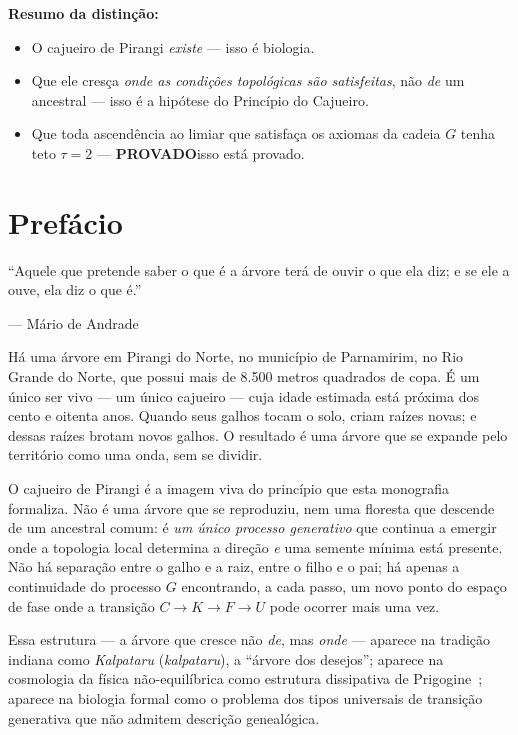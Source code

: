 \documentclass[12pt,a4paper,twoside]{book}
\theoremstyle{plain}
\theoremstyle{definition}
\newcommand{\provadostamp}{\noindent\colorbox{cajunavy!10}{\color{cajunavy}\bfseries\small PROVADO}\quad}
\theoremstyle{definition}
\begin{document}
\begin{tcolorbox}[
  colback=cajunavy!5,
  colframe=cajunavy!40,
  title={Para o leitor biólogo, médico ou engenheiro químico},
  breakable
]
\medskip
\textbf{Resumo da distinção:}
\begin{itemize}
  \item O cajueiro de Pirangi \emph{existe} --- isso é biologia.
  \item Que ele cresça \emph{onde as condições topológicas são satisfeitas},
        não \emph{de} um ancestral --- isso é a hipótese do Princípio do Cajueiro.
  \item Que toda ascendência ao limiar que satisfaça os axiomas da cadeia $G$
        tenha teto $\tau = 2$ --- \provadostamp isso está provado.
\end{itemize}

\end{tcolorbox}

\bigskip
\tableofcontents

\chapter*{Prefácio}

\epigraph{``Aquele que pretende saber o que é a árvore terá de ouvir o que ela
diz; e se ele a ouve, ela diz o que é.''}{--- Mário de Andrade}

Há uma árvore em Pirangi do Norte, no município de Parnamirim, no Rio Grande do
Norte, que possui mais de 8.500 metros quadrados de copa. É um único ser vivo
--- um único cajueiro --- cuja idade estimada está próxima dos cento e
oitenta anos. Quando seus galhos tocam o solo, criam raízes novas; e dessas
raízes brotam novos galhos. O resultado é uma árvore que se expande pelo
território como uma onda, sem se dividir.

O cajueiro de Pirangi é a imagem viva do princípio que esta monografia
formaliza. Não é uma árvore que se reproduziu, nem uma floresta que descende
de um ancestral comum: é \emph{um único processo generativo} que continua
a emergir onde a topologia local determina a direção \emph{e} uma semente
mínima está presente. Não há separação entre o galho e a raiz, entre o
filho e o pai; há apenas a continuidade do processo $G$ encontrando, a
cada passo, um novo ponto do espaço de fase onde a transição
$C \to K \to F \to U$ pode ocorrer mais uma vez.

Essa estrutura --- a árvore que cresce não \emph{de}, mas \emph{onde} ---
aparece na tradição indiana como \emph{Kalpataru} (\emph{kalpataru}),
a ``árvore dos desejos''; aparece na cosmologia da física não-equilíbrica como
estrutura dissipativa de Prigogine~\cite{Prigogine}; aparece na biologia formal como o
problema dos tipos universais de transição generativa que não admitem
descrição genealógica.
\end{document}
